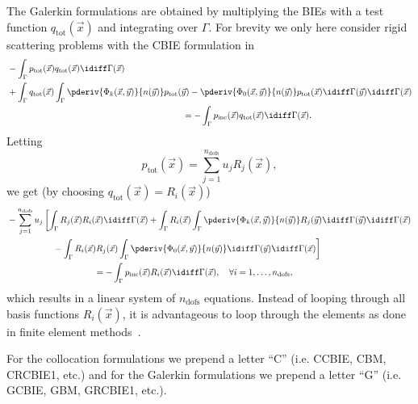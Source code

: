 The Galerkin formulations are obtained by multiplying the BIEs with a test function $q_{\mathrm{tot}}(\vec{x})$ and integrating over $\Gamma$. For brevity we only here consider rigid scattering problems with the CBIE formulation in 
\begin{align*}
	&-\int_\Gamma p_{\mathrm{tot}}(\vec{x})q_{\mathrm{tot}}(\vec{x})\idiff\Gamma(\vec{x})\\
	&+ \int_\Gamma q_{\mathrm{tot}}(\vec{x})\int_\Gamma \pderiv{\Phi_k(\vec{x},\vec{y})}{n(\vec{y})}p_{\mathrm{tot}}(\vec{y}) - \pderiv{\Phi_0(\vec{x},\vec{y})}{n(\vec{y})} p_{\mathrm{tot}}(\vec{x}) \idiff\Gamma(\vec{y})\idiff\Gamma(\vec{x}) \\
	&{\hskip20em\relax}= -\int_\Gamma p_{\mathrm{inc}}(\vec{x})q_{\mathrm{tot}}(\vec{x})\idiff\Gamma(\vec{x}).
\end{align*}
Letting
\begin{equation*}
	p_{\mathrm{tot}}(\vec{x}) = \sum_{j=1}^{n_{\mathrm{dofs}}} u_j R_j(\vec{x}),
\end{equation*}
we get (by choosing $q_{\mathrm{tot}}(\vec{x})=R_i(\vec{x})$)
\begin{align*}
	&-\sum_{j=1}^{n_{\mathrm{dofs}}}u_j \left[\int_\Gamma R_j(\vec{x})R_i(\vec{x})\idiff\Gamma(\vec{x})+ \int_\Gamma R_i(\vec{x})\int_\Gamma \pderiv{\Phi_k(\vec{x},\vec{y})}{n(\vec{y})}R_j(\vec{y}) \idiff\Gamma(\vec{y})\idiff\Gamma(\vec{x})\right.\\ 
	&\left.{\hskip5em\relax}-\int_\Gamma R_i(\vec{x}) R_j(\vec{x})\int_\Gamma \pderiv{\Phi_0(\vec{x},\vec{y})}{n(\vec{y})} \idiff\Gamma(\vec{y})\idiff\Gamma(\vec{x})\right]\\
	&{\hskip10em\relax}= -\int_\Gamma p_{\mathrm{inc}}(\vec{x})R_i(\vec{x})\idiff\Gamma(\vec{x}),\quad \forall i=1,\dots, n_{\mathrm{dofs}},
\end{align*}
which results in a linear system of $n_{\mathrm{dofs}}$ equations. Instead of looping through all basis functions $R_i(\vec{x})$, it is advantageous to loop through the elements as done in finite element methods~\cite{Simpson2014aib}.

For the collocation formulations we prepend a letter ``C'' (i.e. CCBIE, CBM, CRCBIE1, etc.) and for the Galerkin formulations we prepend a letter ``G'' (i.e. GCBIE, GBM, GRCBIE1, etc.).

